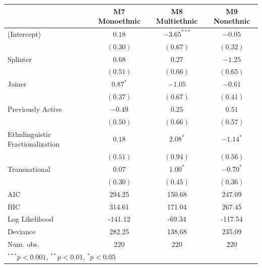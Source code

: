 \documentclass[12pt,]{book}
\let\origtable\table
\let\endorigtable\endtable
\renewenvironment{table}[1][2] {
    \singlespacing
    \expandafter\origtable\expandafter[H]
} {
    \endorigtable
}
\theoremstyle{definition}
\theoremstyle{definition}
\theoremstyle{definition}
\theoremstyle{remark}
\begin{document}
\begin{table}
\begin{center}
\begin{tabular}{l c c c }
\hline
 & M7 Monoethnic & M8 Multiethnic & M9 Nonethnic \\
\hline
(Intercept)                      & $0.18$     & $-3.65^{***}$ & $-0.05$     \\
                                 & $(0.30)$   & $(0.67)$      & $(0.32)$    \\
Splinter                         & $0.68$     & $0.27$        & $-1.25$     \\
                                 & $(0.51)$   & $(0.66)$      & $(0.65)$    \\
Joiner                           & $0.87^{*}$ & $-1.05$       & $-0.61$     \\
                                 & $(0.37)$   & $(0.67)$      & $(0.41)$    \\
Previously Active                & $-0.49$    & $0.25$        & $0.51$      \\
                                 & $(0.50)$   & $(0.66)$      & $(0.57)$    \\
Ethnlinguistic Fractionalization & $0.18$     & $2.08^{*}$    & $-1.14^{*}$ \\
                                 & $(0.51)$   & $(0.94)$      & $(0.56)$    \\
Transnational                    & $0.07$     & $1.00^{*}$    & $-0.70^{*}$ \\
                                 & $(0.30)$   & $(0.45)$      & $(0.36)$    \\
\hline
AIC                              & 294.25     & 150.68        & 247.09      \\
BIC                              & 314.61     & 171.04        & 267.45      \\
Log Likelihood                   & -141.12    & -69.34        & -117.54     \\
Deviance                         & 282.25     & 138.68        & 235.09      \\
Num. obs.                        & 220        & 220           & 220         \\
\hline
\multicolumn{4}{l}{\scriptsize{$^{***}p<0.001$, $^{**}p<0.01$, $^*p<0.05$}}
\end{tabular}
\caption{Logit Models of Rebel Group Ethnic Composition (Central Govt Conflicts Only)}
\label{tab:splintcomp-gov}
\end{center}
\end{table}
\end{document}
